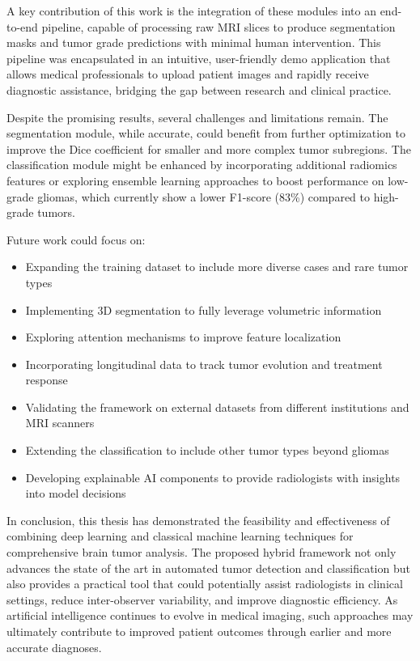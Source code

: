 A key contribution of this work is the integration of these modules into an end-to-end pipeline, capable of processing raw MRI slices to produce segmentation masks and tumor grade predictions with minimal human intervention. This pipeline was encapsulated in an intuitive, user-friendly demo application that allows medical professionals to upload patient images and rapidly receive diagnostic assistance, bridging the gap between research and clinical practice.

Despite the promising results, several challenges and limitations remain. The segmentation module, while accurate, could benefit from further optimization to improve the Dice coefficient for smaller and more complex tumor subregions. The classification module might be enhanced by incorporating additional radiomics features or exploring ensemble learning approaches to boost performance on low-grade gliomas, which currently show a lower F1-score (83\%) compared to high-grade tumors.

Future work could focus on:
\begin{itemize}
  \item Expanding the training dataset to include more diverse cases and rare tumor types
  \item Implementing 3D segmentation to fully leverage volumetric information
  \item Exploring attention mechanisms to improve feature localization
  \item Incorporating longitudinal data to track tumor evolution and treatment response
  \item Validating the framework on external datasets from different institutions and MRI scanners
  \item Extending the classification to include other tumor types beyond gliomas
  \item Developing explainable AI components to provide radiologists with insights into model decisions
\end{itemize}

In conclusion, this thesis has demonstrated the feasibility and effectiveness of combining deep learning and classical machine learning techniques for comprehensive brain tumor analysis. The proposed hybrid framework not only advances the state of the art in automated tumor detection and classification but also provides a practical tool that could potentially assist radiologists in clinical settings, reduce inter-observer variability, and improve diagnostic efficiency. As artificial intelligence continues to evolve in medical imaging, such approaches may ultimately contribute to improved patient outcomes through earlier and more accurate diagnoses.